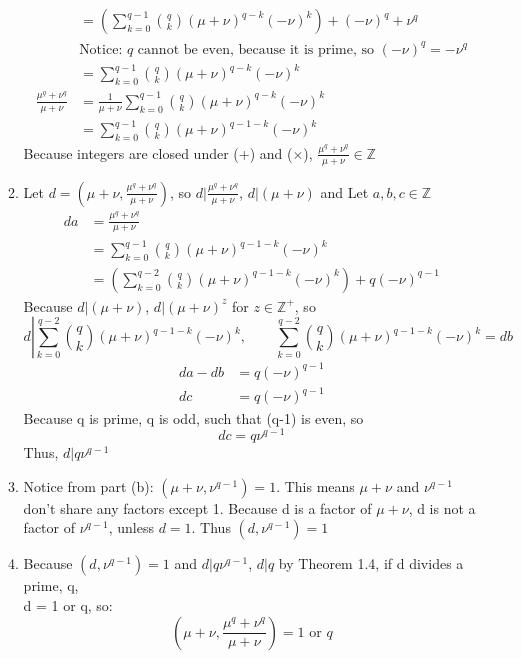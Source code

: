 \documentclass[12pt]{article}
\begin{document}
\begin{enumerate}[label = (\alph*)]
\begin{enumerate}[label = (\roman*)]
\begin{align*}
				&= \left(\sum_{k = 0}^{q - 1} \binom{q}{k}  (\mu + \nu)^{q-k} (-\nu)^k\right) + (-\nu)^q + \nu^q \\
				&\text{Notice: $q$ cannot be even, because it is prime, so $(-\nu)^q = -\nu^q$} \\
				&= \sum_{k = 0}^{q - 1} \binom{q}{k} (\mu + \nu)^{q-k} (-\nu)^k \\
				\frac{\mu ^ q + \nu^q}{\mu + \nu} &= \frac{1}{\mu + \nu}\sum_{k = 0}^{q - 1} \binom{q}{k} (\mu + \nu)^{q-k} (-\nu)^k \\
				&= \sum_{k = 0}^{q - 1} \binom{q}{k} (\mu + \nu)^{q-1-k} (-\nu)^k
			\end{align*}
			Because integers are closed under (+) and ($\times$), $\frac{\mu ^ q + \nu^q}{\mu + \nu} \in \mathbb{Z}$ 
			\item Let $d = \left( \mu + \nu, \frac{\mu ^ q + \nu^q}{\mu + \nu}\right)$, so $d|\frac{\mu ^ q + \nu^q}{\mu + \nu}$, $d|(\mu + \nu)$ and Let $a,b,c \in \mathbb{Z}$
			\begin{align*}
				da &= \frac{\mu ^ q + \nu^q}{\mu + \nu} \\
				&= \sum_{k = 0}^{q - 1} \binom{q}{k} (\mu + \nu)^{q-1-k} (-\nu)^k \\
				&= \left(\sum_{k = 0}^{q - 2} \binom{q}{k} (\mu + \nu)^{q-1-k} (-\nu)^k\right) + q(-\nu)^{q-1}
			\end{align*}
			Because $d|(\mu + \nu)$, $d|(\mu + \nu)^z$ for $z \in \mathbb{Z}^+$, so 
			$$d \left | \sum_{k = 0}^{q - 2} \binom{q}{k} (\mu + \nu)^{q-1-k} (-\nu)^k ,\qquad  \sum_{k = 0}^{q - 2} \binom{q}{k} (\mu + \nu)^{q-1-k} (-\nu)^k \right. = db$$
			\begin{align*}
				da - db &= q(-\nu)^{q-1} \\
				dc &= q(-\nu)^{q-1}
			\end{align*}
			Because q is prime, q is odd, such that (q-1) is even, so 
			$$ dc = q\nu^{q-1} $$
			Thus, $d| q\nu^{q-1} $
			\item Notice from part (b): $(\mu + \nu, \nu^{q-1}) = 1$.  This means $\mu + \nu$ and $\nu^{q-1}$ don't share any factors except 1.  Because d is a factor of $\mu + \nu$, d is not a factor of $\nu^{q-1}$, unless $d = 1$.  Thus $(d, \nu^{q-1}) = 1$ 
			\item Because $(d,\nu^{q-1}) = 1$ and $d|q\nu^{q-1}$, $d|q$ by Theorem 1.4, if d divides a prime, q, \\ d = 1 or q, so: $$ \left( \mu + \nu, \frac{\mu ^ q + \nu^q}{\mu + \nu}\right) = 1 \text{ or } q $$ 
		\end{enumerate}
	\end{enumerate}
\end{document}
